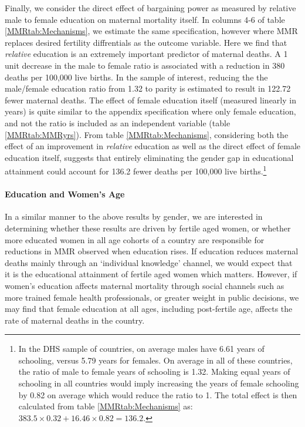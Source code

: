 \documentclass{article}[12pt,subeqn]
\begin{document}
\begin{spacing}{1.4}
Finally, we consider the direct effect of bargaining power as measured by relative
male to female education on maternal mortality itself.  In columns 4-6 of table
\ref{MMRtab:Mechanisms}, we estimate the same specification, however where MMR
replaces desired fertility diffrentials as
the outcome variable.  Here we find that \emph{relative} education is an
extremely important predictor of maternal deaths.  A 1 unit decrease in the male
to female ratio is associated with a reduction in 380 deaths per 100,000 live
births.  In the sample of interest, reducing the the male/female education ratio
from 1.32 to parity is estimated to result in 122.72 fewer maternal deaths.  The
effect of female education itself (measured linearly in years) is quite similar
to the appendix specification where only female education, and not the ratio
is included as an independent variable (table \ref{MMRtab:MMRyrs}).  From table
\ref{MMRtab:Mechanisms}, considering both the effect of an improvement in
\emph{relative} education as well as the direct effect of female education itself,
suggests that entirely eliminating the gender gap in educational attainment
could account for 136.2 fewer deaths per 100,000 live births.\footnote{In the
  DHS sample of countries, on average males have 6.61 years of schooling, versus
  5.79 years for females.  On average in all of these countries, the ratio of male to
  female years of schooling is 1.32. Making equal years of schooling in all countries
  would imply increasing the years of female schooling by 0.82 on average which would
  reduce the ratio to 1.  The total effect is then calculated from table
  \ref{MMRtab:Mechanisms} as: $383.5\times 0.32+16.46\times 0.82=136.2$.}


\paragraph{Education and Women's Age}
\label{ssscn:age}
In a similar manner to the above results by gender, we are interested in
determining whether these results are driven by fertile aged women, or whether
more educated women in all age cohorts of a country are responsible for
reductions in MMR observed when education rises.  If education reduces maternal
deaths mainly through an `individual knowledge' channel, we would expect that
it is the educational attainment of fertile aged women which matters.  However,
if women's education affects maternal mortality through social channels such as
more trained female health professionals, or greater weight in public decisions,
we may find that female education at all ages, including post-fertile age, affects
the rate of maternal deaths in the country.


\end{spacing}
\end{document}
